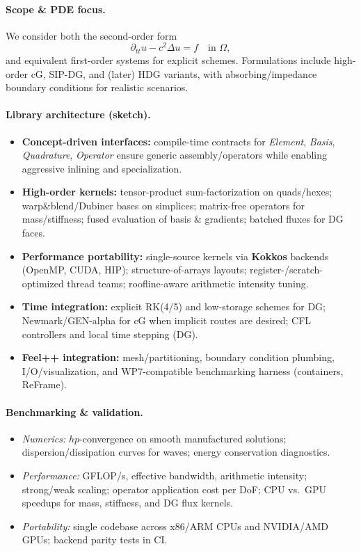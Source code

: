 \paragraph{Scope \& PDE focus.}
We consider both the second-order form
\[
  \partial_{tt} u - c^2 \Delta u = f \quad \text{in }\Omega,
\]
and equivalent first-order systems for explicit schemes. Formulations include high-order cG, SIP-DG, and (later) HDG variants, with absorbing/impedance boundary conditions for realistic scenarios.

\paragraph{Library architecture (sketch).}
\begin{itemize}
  \item \textbf{Concept-driven interfaces:} compile-time contracts for \emph{Element}, \emph{Basis}, \emph{Quadrature}, \emph{Operator} ensure generic assembly/operators while enabling aggressive inlining and specialization.
  \item \textbf{High-order kernels:} tensor-product sum-factorization on quads/hexes; warp\&blend/Dubiner bases on simplices; matrix-free operators for mass/stiffness; fused evaluation of basis \& gradients; batched fluxes for DG faces.
  \item \textbf{Performance portability:} single-source kernels via \textbf{Kokkos} backends (OpenMP, CUDA, HIP); structure-of-arrays layouts; register-/scratch-optimized thread teams; roofline-aware arithmetic intensity tuning.
  \item \textbf{Time integration:} explicit RK(4/5) and low-storage schemes for DG; Newmark/GEN-alpha for cG when implicit routes are desired; CFL controllers and local time stepping (DG).
  \item \textbf{Feel++ integration:} mesh/partitioning, boundary condition plumbing, I/O/visualization, and WP7-compatible benchmarking harness (containers, ReFrame).
\end{itemize}

\paragraph{Benchmarking \& validation.}
\begin{itemize}
  \item \textit{Numerics:} $h\!p$-convergence on smooth manufactured solutions; dispersion/dissipation curves for waves; energy conservation diagnostics.
  \item \textit{Performance:} GFLOP/s, effective bandwidth, arithmetic intensity; strong/weak scaling; operator application cost per DoF; CPU vs.\ GPU speedups for mass, stiffness, and DG flux kernels.
  \item \textit{Portability:} single codebase across x86/ARM CPUs and NVIDIA/AMD GPUs; backend parity tests in CI.
\end{itemize}

